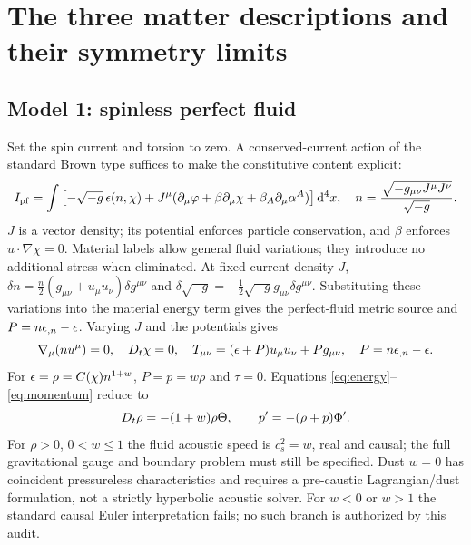\section{The three matter descriptions and their symmetry limits}
\subsection{Model 1: spinless perfect fluid}
Set the spin current and torsion to zero. A conserved-current action of the standard Brown type \cite{Brown} suffices to make the constitutive content explicit:
\begin{equation}\label{eq:fluidaction}
 I_{\rm pf}=\int\left[-\sqrt{-g}\,\epsilon(n,\chi)+J^\mu(\partial_\mu\varphi+\beta\partial_\mu\chi+\beta_A\partial_\mu\alpha^A)\right]\mathrm d^4x,
 \quad n=\frac{\sqrt{-g_{\mu\nu}J^\mu J^\nu}}{\sqrt{-g}}.
\end{equation}
$J$ is a vector density; its potential enforces particle conservation, and $\beta$ enforces $u\cdot\nabla\chi=0$. Material labels allow general fluid variations; they introduce no additional stress when eliminated. At fixed current density $J$, $\delta n=\tfrac n2(g_{\mu\nu}+u_\mu u_\nu)\delta g^{\mu\nu}$ and $\delta\sqrt{-g}=-\tfrac12\sqrt{-g}g_{\mu\nu}\delta g^{\mu\nu}$. Substituting these variations into the material energy term gives the perfect-fluid metric source and $P=n\epsilon_{,n}-\epsilon$. Varying $J$ and the potentials gives
\begin{equation}
 \nabla_\mu(nu^\mu)=0,\quad D_t\chi=0,\quad
 T_{\mu\nu}=(\epsilon+P)u_\mu u_\nu+Pg_{\mu\nu},\quad
 P=n\epsilon_{,n}-\epsilon.
\end{equation}
For $\epsilon=\rho=C(\chi)n^{1+w}$, $P=p=w\rho$ and $\tau=0$. Equations \eqref{eq:energy}--\eqref{eq:momentum} reduce to
\begin{equation}\label{eq:PFconservation}
 D_t\rho=-(1+w)\rho\Theta,\qquad p'=-(\rho+p)\Phi'.
\end{equation}
For $\rho>0$, $0<w\leq1$ the fluid acoustic speed is $c_s^2=w$, real and causal; the full gravitational gauge and boundary problem must still be specified. Dust $w=0$ has coincident pressureless characteristics and requires a pre-caustic Lagrangian/dust formulation, not a strictly hyperbolic acoustic solver. For $w<0$ or $w>1$ the standard causal Euler interpretation fails; no such branch is authorized by this audit.

